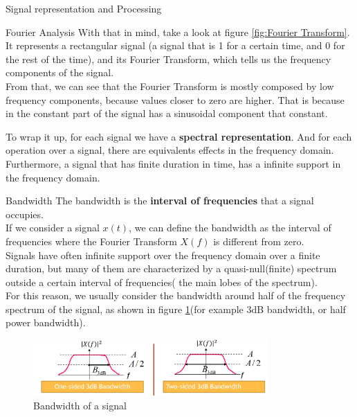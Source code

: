 \begin{section}{Signal representation and Processing}
\begin{subsection}{Fourier Analysis}
    With that in mind, take a look at figure \ref{fig:Fourier Transform}. It represents a rectangular
    signal (a signal that is 1 for a certain time, and 0 for the rest of the time), and its Fourier
    Transform, which tells us the frequency components of the signal.\\
    From that, we can see that the Fourier Transform is mostly composed by low frequency components,
    because values closer to zero are higher. That is because in the constant part of the signal
    has a sinusoidal component that constant.

    \begin{boxH}
      To wrap it up, for each signal we have a \textbf{spectral representation}. And for each operation
      over a signal, there are equivalents effects in the frequency domain.\\
      Furthermore, a signal that has finite duration in time, has a infinite support in the frequency
      domain.
    \end{boxH}
  \end{subsection}
  \begin{subsection}{Bandwidth}
    The bandwidth is the \textbf{interval of frequencies} that a signal occupies.\\
    If we consider a signal $x(t)$, we can define the bandwidth as the interval of frequencies
    where the Fourier Transform $X(f)$ is different from zero. \\ 
    Signals have often infinite support over the frequency domain over a finite duration, but many 
    of them are characterized by a quasi-null(finite) spectrum outside a certain interval of 
    frequencies( the main lobes of the spectrum).\\
    For this reason, we usually consider the bandwidth around half of the frequency spectrum of the
    signal, as shown in figure \ref{fig:Bandwidth}(for example 3dB bandwidth, or half power 
    bandwidth).\\
    \begin{figure}[h]
      \centering
      \includegraphics[width=0.8\textwidth]{img/bandwidth.png}
      \caption{Bandwidth of a signal}
      \label{fig:Bandwidth}
    \end{figure}

\end{subsection}
\end{section}
